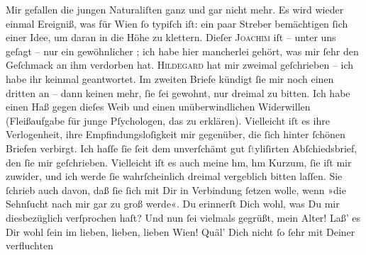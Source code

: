 \begin{ledgroupsized}[t]{13cm}
           \pstart
           Mir gefallen die jungen Naturaliſten ganz und gar nicht mehr. Es wird wieder einmal
               Ereigniß, was für Wien ſo \strikeout{\textcolor{gray}{t}\textcolor{gray}{×}} typiſch iſt: ein paar Streber bemächtigen ſich einer Idee, um daran in die
               Höhe zu klettern. Dieſer \textsc{Joachim} iſt – unter uns geſagt – nur ein gewöhnlicher \label{K_L02661-5v}\label{K_L02661-5h}; ich habe
               hier mancherlei gehört, was mir ſehr den Geſchmack an ihm verdorben hat.\pend
           \pstart
           \textsc{Hildegard} hat mir zweimal geſchrieben –  ich habe
               ihr keinmal geantwortet. Im zweiten Briefe kündigt ſie mir noch einen dritten an –
               dann keinen mehr, ſie ſei gewohnt, nur dreimal zu bitten. Ich habe einen Haß gegen
               dieſes Weib und einen
               unüberwindlichen Widerwillen (Fleißaufgabe für junge Pſychologen, das zu erklären).
                  {\pb}Vielleicht iſt es ihre Verlogenheit, ihre
               Empfindungsloſigkeit mir gegenüber, die ſich hinter ſchönen Briefen verbirgt. Ich
               haſſe ſie ſeit dem unverſchämt gut ſ\textcolor{gray}{t}yliſirten Abſchiedsbrief, den
               ſie mir geſchrieben. Vielleicht iſt es auch meine {\dotsfour} hm, hm
                  {\dotsfour} Kurzum, ſie iſt mir zuwider, und ich werde ſie
               wahrſcheinlich dreimal vergeblich bitten laſſen. Sie ſchrieb auch davon, daß ſie ſich
               mit Dir in Verbindung ſetzen wolle, wenn »die Sehnſucht nach  mir gar
               zu groß werde«. Du erinnerſt Dich wohl, was Du mir diesbezüglich verſprochen haſt? {\dotsfour}\pend
           \pstart
           Und nun ſei vielmals gegrüßt, mein Alter! Laß’ es Dir wohl ſein im lieben, lieben,
               lieben Wien! Quäl’ {\pb}Dich nicht ſo ſehr mit Deiner verfluchten

\end{ledgroupsized}
